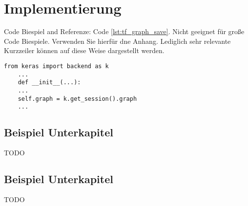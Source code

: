 \chapter{Implementierung}

\label{cha:implmentation}
Code Biespiel and Referenze: Code \ref{lst:tf_graph_save}. Nicht geeignet für große Code Biespiele. Verwenden Sie hierfür dne Anhang. Lediglich sehr relevante Kurzzeiler können auf diese Weise dargestellt werden. 
\begin{lstlisting}[caption={Klasse Agent - Tensorflow Graph}, captionpos=b, label={lst:tf_graph_save}]
	from keras import backend as k
	...
	def __init__(...):
	...
	self.graph = k.get_session().graph
	...
\end{lstlisting}

\section{Beispiel Unterkapitel}
TODO \cite{chollet2015}

\section{Beispiel Unterkapitel}
TODO